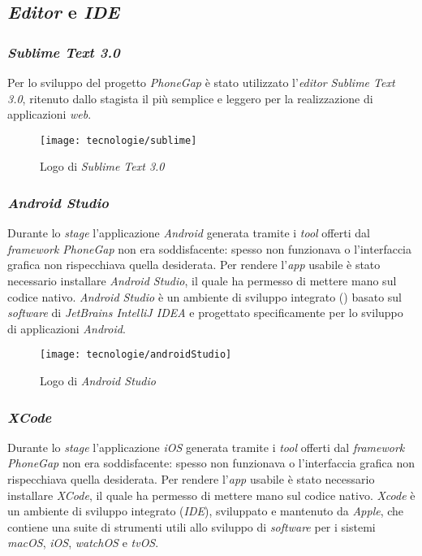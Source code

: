 \subsection{\textit{Editor} e \textit{IDE}}

\subsubsection{\textit{Sublime Text 3.0}}

Per lo sviluppo del progetto \textit{PhoneGap} è stato utilizzato l'\textit{editor} \textit{Sublime Text 3.0}, ritenuto dallo stagista il più semplice e leggero per la realizzazione di applicazioni \textit{web}. 

\begin{figure}[!h] 
    \centering 
    \texttt{[image: tecnologie/sublime]} 
    \caption{Logo di \textit{Sublime Text 3.0}}
\end{figure}

\subsubsection{\textit{Android Studio}}

Durante lo \textit{stage} l'applicazione \textit{Android} generata tramite i \textit{tool} offerti dal \textit{framework PhoneGap} non era soddisfacente: spesso non funzionava o l'interfaccia grafica non rispecchiava quella desiderata. Per rendere l'\textit{app} usabile è stato necessario installare \textit{Android Studio}, il quale ha permesso di mettere mano sul codice nativo. \textit{Android Studio} è un ambiente di sviluppo integrato () basato sul \textit{software} di \textit{JetBrains IntelliJ IDEA} e progettato specificamente per lo sviluppo di applicazioni \textit{Android}.

\begin{figure}[!h] 
    \centering 
    \texttt{[image: tecnologie/androidStudio]} 
    \caption{Logo di \textit{Android Studio}}
\end{figure}

\subsubsection{\textit{XCode}}

Durante lo \textit{stage} l'applicazione \textit{iOS} generata tramite i \textit{tool} offerti dal \textit{framework PhoneGap} non era soddisfacente: spesso non funzionava o l'interfaccia grafica non rispecchiava quella desiderata. Per rendere l'\textit{app} usabile è stato necessario installare \textit{XCode}, il quale ha permesso di mettere mano sul codice nativo. \textit{Xcode} è un ambiente di sviluppo integrato (\textit{IDE}), sviluppato e mantenuto da \textit{Apple}, che contiene una suite di strumenti utili allo sviluppo di \textit{software} per i sistemi \textit{macOS}, \textit{iOS}, \textit{watchOS} e \textit{tvOS}.


